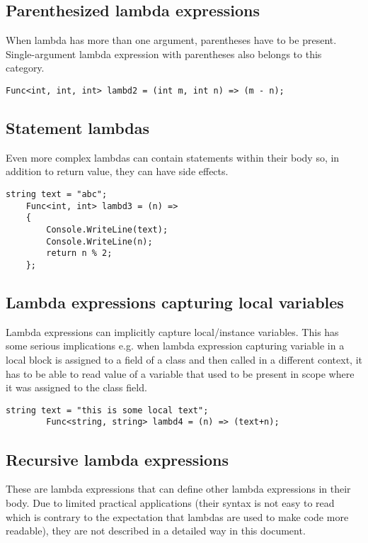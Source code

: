 \documentclass[]{report}
\begin{document}
    \subsection{Parenthesized lambda expressions}    
    When lambda has more than one argument, parentheses have to be present. Single-argument lambda expression with parentheses also belongs to this category.
    \begin{lstlisting}[style=sharpc, caption=Lambda arguments can have types defined explicitly]
    Func<int, int, int> lambd2 = (int m, int n) => (m - n);
    \end{lstlisting}
    
    \subsection{Statement lambdas}
    Even more complex lambdas can contain statements within their body so, in addition to return value, they can have side effects.
    \begin{lstlisting}[style=sharpc, caption=execution lambd3 has side-effects that have no impact on the returned value]
    string text = "abc";
    Func<int, int> lambd3 = (n) =>
    {
        Console.WriteLine(text);
        Console.WriteLine(n);
        return n % 2;
    };
    \end{lstlisting}
    
    \subsection{Lambda expressions capturing local variables}
        Lambda expressions can implicitly capture local/instance variables. This has some serious implications e.g. when lambda expression capturing variable in a local block is assigned to a field of a class and then called in a different context, it has to be able to read value of a variable that used to be present in scope where it was assigned to the class field.
        \begin{lstlisting}[style=sharpc, caption="lambd4 has access to the local variable text in any context that. This property is sometimes called closure"]        
        string text = "this is some local text";
        Func<string, string> lambd4 = (n) => (text+n);
        \end{lstlisting}
    
    \subsection{Recursive lambda expressions}
    These are lambda expressions that can define other lambda expressions in their body. Due to limited practical applications (their syntax is not easy to read which is contrary to the expectation that lambdas are used to make code more readable), they are not described in a detailed way in this document.
    
\end{document}
